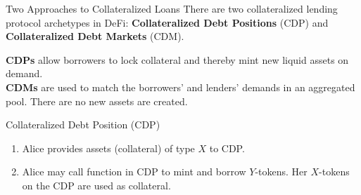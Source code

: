 \documentclass[handout]{beamer}
\begin{document}
\begin{frame}{Two Approaches to Collateralized Loans}
	\vspace{1em}
	There are two collateralized lending protocol archetypes in DeFi: \textbf{Collateralized Debt Positions} (CDP) and \textbf{Collateralized Debt Markets} (CDM).\\ \vspace{1em}

	\textbf{CDPs} allow borrowers to lock collateral and thereby mint new liquid assets on demand.\\ \vspace{1em}
	\textbf{CDMs} are used to match the borrowers' and lenders' demands in an aggregated pool. There are no new assets are created.
\end{frame}


\begin{frame}{Collateralized Debt Position (CDP)}

\vspace{-1em}

\begin{figure}[t]
	\centering
	\begin{tikzpicture}[scale=1.0, every node/.style={scale=1.0}]
		
	\end{tikzpicture}
\end{figure}


\small

\begin{enumerate}
	\item<2-> {Alice provides assets (collateral) of type $X$ to CDP.}
	\item<3-> {Alice may call function in CDP to mint and borrow $Y$-tokens. Her $X$-tokens on the CDP are used as collateral.}
\end{enumerate}

	
\end{frame}
\end{document}
